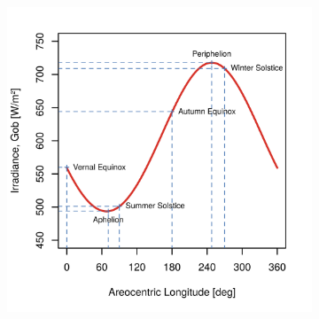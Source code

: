 \begin{figure}[h]
\captionsetup[subfigure]{justification=centering}
\vspace{-2ex}
\centering
    \setlength{\subfigureWidth}{0.50\textwidth}
    \setlength{\graphicsHeight}{80mm}
    \hypersetup{hidelinks=true}%
    \begin{subfigure}[t]{\subfigureWidth}
        \centering
            \includegraphics[height=\graphicsHeight]{sections/mars-solar-energy/solar-radiation/plots/gob-daily-variations.png}
            \label{fig:plot:beam-irradiance-top-of-mars-atmosphere}
    \end{subfigure}\hfill
    \begin{subfigure}[t]{\subfigureWidth}
        \centering

\end{subfigure}
\end{figure}
